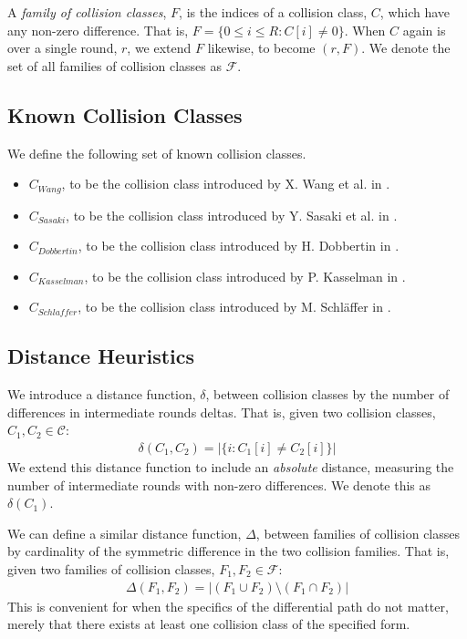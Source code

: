 \documentclass[conference]{IEEEtran}
\begin{document}
A \textit{family of collision classes}, $F$, is the indices of a
collision class, $C$, which have any non-zero difference. That is,
$F = \{ 0 \leq i \leq R : C[i] \neq 0 \}$. When $C$ again is over
a single round, $r$, we extend $F$ likewise, to become
$(r, F)$. We denote the set of all families of collision classes as
$\mathcal{F}$.

\subsection{Known Collision Classes}

We define the following set of known collision classes.

\begin{itemize}
    \item $C_{Wang}$, to be the collision class introduced by X. Wang
        et al. in \cite{Wang2005}.
    \item $C_{Sasaki}$, to be the collision class introduced by Y. Sasaki
        et al. in \cite{Sasaki2007}.
    \item $C_{Dobbertin}$, to be the collision class introduced by
        H. Dobbertin in \cite{Dobbertin1998}.
    \item $C_{Kasselman}$, to be the collision class introduced by
        P. Kasselman in \cite{KasselmanMD4}.
    \item $C_{Schlaffer}$, to be the collision class introduced by
        M. Schl{\"a}ffer in \cite{Schlaffer2006}.
\end{itemize}

\subsection{Distance Heuristics} \label{terminology:distance}

We introduce a distance function, $\delta$, between collision classes by the
number of differences in intermediate rounds deltas. That is, given two
collision classes, $C_1, C_2 \in \mathcal{C}$:
\begin{align}
    \delta(C_1, C_2) = \big| \{ i : C_1[i] \neq C_2[i] \} \big|
\end{align}
We extend this distance function to include an \textit{absolute} distance,
measuring the number of intermediate rounds with non-zero differences.
We denote this as $\delta(C_1)$.

We can define a similar distance function, $\Delta$, between families of
collision classes by cardinality of the symmetric difference in the two
collision families. That is, given two families of collision classes,
$F_1, F_2 \in \mathcal{F}$:
\begin{align}
    \Delta(F_1, F_2) = \big| (F_1 \cup F_2) \setminus (F_1 \cap F_2) \big|
\end{align}
This is convenient for when the specifics of the differential path do not
matter, merely that there exists at least one collision class of the specified
form.
\end{document}
